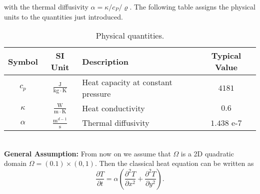 \documentclass[a4paper,11pt]{article}
\begin{document}
with the thermal diffusivity $\alpha = \kappa / c_P / \varrho $. The following table assigns the physical units to the quantities just introduced.
\begin{table}[h!] 
\centering
{ \renewcommand{\arraystretch}{1.4}
\begin{tabular}{cclc}
\toprule
\textbf{Symbol} & \textbf{SI Unit} & \textbf{Description}& \textbf{Typical Value}\\
\midrule
$c_p$ & $\tfrac{\mathrm{J}}{\mathrm{kg}\cdot\mathrm{K} }$ & Heat capacity at constant pressure &  $ 4181 $\\
$\kappa $ & $\tfrac{\mathrm{W}}{\mathrm{m}\cdot\mathrm{K} }$ & Heat conductivity & $ 0.6 $\\
$\alpha $ & $\tfrac{\mathrm{m}^{d-1}}{\mathrm{s} }$ &  Thermal diffusivity & $ 1.438$ e-$7 $\\
\bottomrule
\end{tabular}}
\caption{Physical quantities.}
\label{TableTypicalValues}
\end{table}
\\
\textbf{General Assumption:} From now on we assume that $\Omega $ is a  2D quadratic domain $\Omega = (0.1)\times (0,1)$. Then the classical heat equation can be written as
\begin{equation} \label{HeatEquation2D}
\frac{\partial T}{\partial t} = \alpha \left( \frac{\partial^2 T}{\partial x^2} + \frac{\partial^2 T}{\partial y^2} \right) .
\end{equation}
\end{document}
